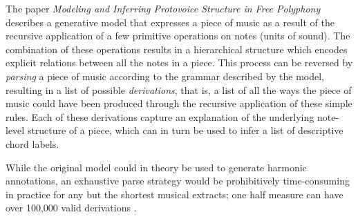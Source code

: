 \documentclass[12pt,a4paper,twoside,openright]{report} \usepackage[pdfborder={0 0 0}]{hyperref}    %
\theoremstyle{definition} \newtheorem{definition}{Definition}[section]
\begin{document}
    The paper \textit{Modeling and Inferring Protovoice Structure in Free Polyphony} describes a generative model that
    expresses a piece of music as a result of the recursive application of a few primitive operations on notes (units of
    sound). The combination of these operations results in a hierarchical structure which encodes explicit relations
    between all the notes in a piece. This process can be reversed by \textit{parsing} a piece of music according to the
    grammar described by the model, resulting in a list of possible \textit{derivations}, that is, a list of all the
    ways the piece of music could have been produced through the recursive application of these simple rules. Each of
    these derivations capture an explanation of the underlying note-level structure of a piece, which can in turn be
    used to infer a list of descriptive chord labels.




    While the original model could in theory be used to generate harmonic annotations, an exhaustive parse strategy
    would be prohibitively time-consuming in practice for any but the shortest musical extracts; one half measure can
    have over 100,000 valid derivations \cite{finkensiepStructureFreePolyphony2023}. 
\end{document}
